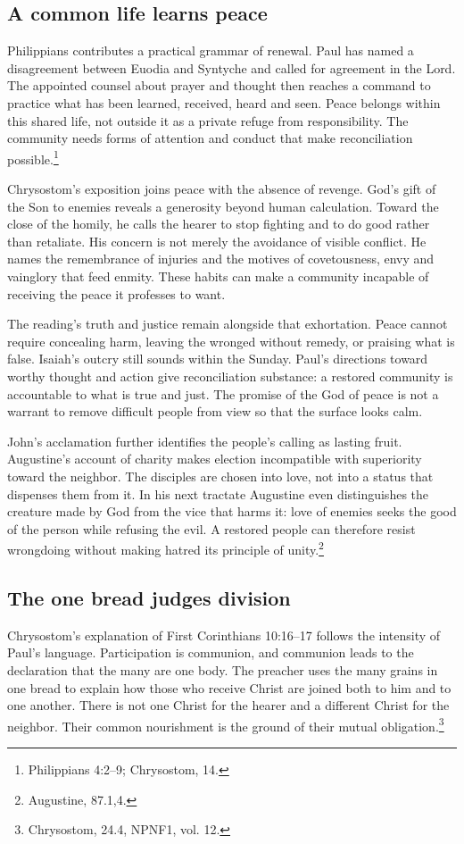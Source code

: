 \subsection{A common life learns peace}
Philippians contributes a practical grammar of renewal. Paul has named a disagreement between Euodia and Syntyche and called for agreement in the Lord. The appointed counsel about prayer and thought then reaches a command to practice what has been learned, received, heard and seen. Peace belongs within this shared life, not outside it as a private refuge from responsibility. The community needs forms of attention and conduct that make reconciliation possible.\footnote{Philippians 4:2--9; Chrysostom,  14.}

Chrysostom's exposition joins peace with the absence of revenge. God's gift of the Son to enemies reveals a generosity beyond human calculation. Toward the close of the homily, he calls the hearer to stop fighting and to do good rather than retaliate. His concern is not merely the avoidance of visible conflict. He names the remembrance of injuries and the motives of covetousness, envy and vainglory that feed enmity. These habits can make a community incapable of receiving the peace it professes to want.

The reading's truth and justice remain alongside that exhortation. Peace cannot require concealing harm, leaving the wronged without remedy, or praising what is false. Isaiah's outcry still sounds within the Sunday. Paul's directions toward worthy thought and action give reconciliation substance: a restored community is accountable to what is true and just. The promise of the God of peace is not a warrant to remove difficult people from view so that the surface looks calm.

John's acclamation further identifies the people's calling as lasting fruit. Augustine's account of charity makes election incompatible with superiority toward the neighbor. The disciples are chosen into love, not into a status that dispenses them from it. In his next tractate Augustine even distinguishes the creature made by God from the vice that harms it: love of enemies seeks the good of the person while refusing the evil. A restored people can therefore resist wrongdoing without making hatred its principle of unity.\footnote{Augustine,  87.1,4.}

\subsection{The one bread judges division}
Chrysostom's explanation of First Corinthians 10:16--17 follows the intensity of Paul's language. Participation is communion, and communion leads to the declaration that the many are one body. The preacher uses the many grains in one bread to explain how those who receive Christ are joined both to him and to one another. There is not one Christ for the hearer and a different Christ for the neighbor. Their common nourishment is the ground of their mutual obligation.\footnote{Chrysostom,  24.4, NPNF1, vol. 12.}

